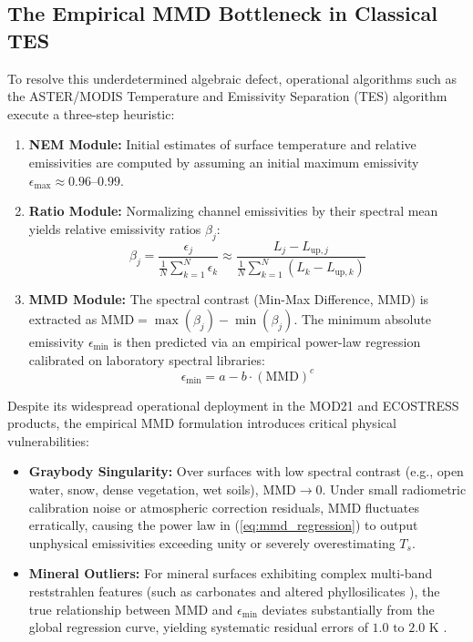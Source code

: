 \documentclass[journal]{IEEEtran}
\begin{document}
\subsection{The Empirical MMD Bottleneck in Classical TES}
To resolve this underdetermined algebraic defect, operational algorithms such as the ASTER/MODIS Temperature and Emissivity Separation (TES) algorithm \cite{gillespie1998temperature, hulley2015mod21, hulley2018ecostress} execute a three-step heuristic:
\begin{enumerate}
    \item \textbf{NEM Module:} Initial estimates of surface temperature and relative emissivities are computed by assuming an initial maximum emissivity $\epsilon_{\max} \approx 0.96$--$0.99$.
    \item \textbf{Ratio Module:} Normalizing channel emissivities by their spectral mean yields relative emissivity ratios $\beta_j$:
    \begin{equation}
    \beta_j = \frac{\epsilon_j}{\frac{1}{N}\sum_{k=1}^N \epsilon_k} \approx \frac{L_j - L_{\text{up},j}}{\frac{1}{N}\sum_{k=1}^N (L_k - L_{\text{up},k})}
    \end{equation}
    \item \textbf{MMD Module:} The spectral contrast (Min-Max Difference, MMD) is extracted as $\text{MMD} = \max(\beta_j) - \min(\beta_j)$. The minimum absolute emissivity $\epsilon_{\min}$ is then predicted via an empirical power-law regression calibrated on laboratory spectral libraries:
    \begin{equation}
    \epsilon_{\min} = a - b \cdot (\text{MMD})^c
    \label{eq:mmd_regression}
    \end{equation}
\end{enumerate}
Despite its widespread operational deployment in the MOD21 and ECOSTRESS products, the empirical MMD formulation introduces critical physical vulnerabilities:
\begin{itemize}
    \item \textbf{Graybody Singularity:} Over surfaces with low spectral contrast (e.g., open water, snow, dense vegetation, wet soils), $\text{MMD} \to 0$. Under small radiometric calibration noise or atmospheric correction residuals, $\text{MMD}$ fluctuates erratically, causing the power law in (\ref{eq:mmd_regression}) to output unphysical emissivities exceeding unity or severely overestimating $T_s$.
    \item \textbf{Mineral Outliers:} For mineral surfaces exhibiting complex multi-band reststrahlen features (such as carbonates and altered phyllosilicates \cite{hecker2011thermal}), the true relationship between $\text{MMD}$ and $\epsilon_{\min}$ deviates substantially from the global regression curve, yielding systematic residual errors of $1.0\text{ to }2.0\text{ K}$ \cite{perezplanells2017retrieval}.
\end{itemize}
\end{document}
